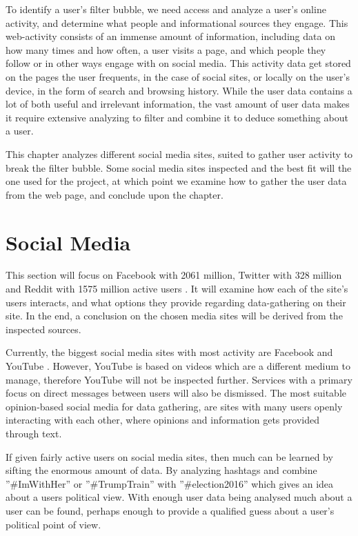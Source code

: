 
To identify a user's filter bubble, we need access and analyze a user's online
activity, and determine what people and informational sources they engage. This
web-activity consists of an immense amount of information, including data on how
many times and how often, a user visits a page, and which people they follow or
in other ways engage with on social media. This activity data get stored on the
pages the user frequents, in the case of social sites, or locally on the user's
device, in the form of search and browsing history. While the user data contains
a lot of both useful and irrelevant information, the vast amount of user data
makes it require extensive analyzing to filter and combine it to deduce
something about a user.\nl

This chapter analyzes different social media sites, suited to gather user
activity to break the filter bubble. Some social media sites inspected and the
best fit will the one used for the project, at which point we examine how to
gather the user data from the web page, and conclude upon the chapter.


\section{Social Media}
This section will focus on Facebook with 2061 million, Twitter with 328 million
and Reddit with 1575 million active users \citep{SocialMediaStats,
AdvertiseOnReddit}.
It will examine how each of the site's users interacts, and what options they
provide regarding data-gathering on their site. In the end, a conclusion on the
chosen media sites will be derived from the inspected sources.

Currently, the biggest social media sites with most activity are Facebook and
YouTube \citep{SocialMediaStats}. However, YouTube is based on videos which are
a different medium to manage, therefore YouTube will not be inspected further.
Services with a primary focus on direct messages between users will also be
dismissed. The most suitable opinion-based social media for data gathering, are
sites with many users openly interacting with each other, where opinions and
information gets provided through text.\nl

If given fairly active users on social media sites, then much can be learned by
sifting the enormous amount of data. By analyzing hashtags and combine
”\#ImWithHer” or ”\#TrumpTrain” with ”\#election2016” which gives an idea about
a users political view. With enough user data being analysed much about a user
can be found, perhaps enough to provide a qualified guess about a user's
political point of view.\nl




